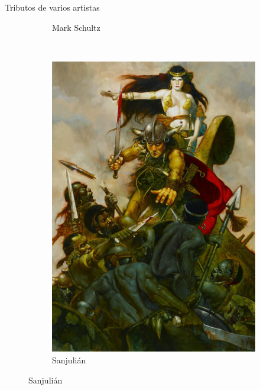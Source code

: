 \begin{frame}{Tributos de varios artistas}
\begin{figure}[htp]
\begin{subfigure}[b]{0.4\textwidth}
			\caption{Mark Schultz}
		\end{subfigure}
		~
		\begin{subfigure}[b]{0.22\textwidth}
			\includegraphics[width=\textwidth]{img/tributos/SanJullian}
			\caption{Sanjulián}
		\end{subfigure}
	\end{figure}
\end{frame}
\note[itemize]{
	\item
}

\begin{frame}{}
	\maketitle
\end{frame}
